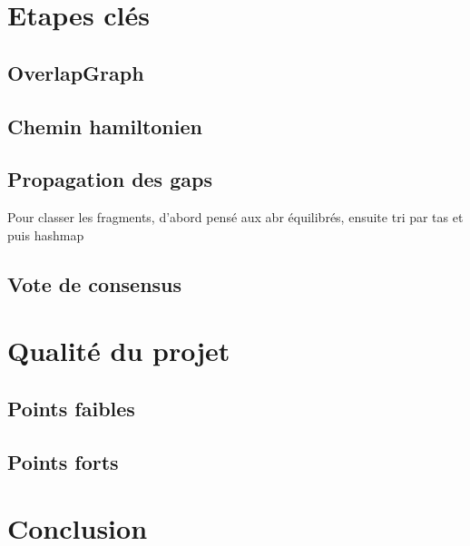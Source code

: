 \documentclass{article}
\begin{document}
\section{Etapes clés}

\subsection{OverlapGraph}

\subsection{Chemin hamiltonien}

\subsection{Propagation des gaps}

Pour classer les fragments, d'abord pensé aux abr équilibrés, ensuite tri par tas et puis hashmap

\subsection{Vote de consensus}

\section{Qualité du projet}

\subsection{Points faibles}

\subsection{Points forts}

\section{Conclusion}
\end{document}
